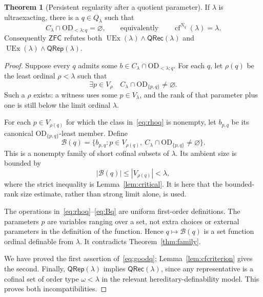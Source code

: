 \documentclass[11pt,letterpaper]{article}
\theoremstyle{definition}
\newtheorem{theorem}[definition]{Theorem}
\numberwithin{equation}{section}
\newcommand{\ZFC}{\mathsf{ZFC}}
\newcommand{\OD}{\mathrm{OD}}
\newcommand{\UEx}{\operatorname{UEx}}
\newcommand{\cf}{\operatorname{cf}}
\newcommand{\Qlam}{Q_\lambda}
\newcommand{\Clam}{C_\lambda}
\newcommand{\ODq}{\OD_{<\lambda;q}}
\newcommand{\QRec}{\mathsf{QRec}}
\newcommand{\QRep}{\mathsf{QRep}}
\begin{document}
\begin{theorem}[Persistent regularity after a quotient parameter]\label{thm:goodq}
If $\lambda$ is ultraexacting, there is a $q\in\Qlam$ such that
\begin{equation}\label{eq:goodq}
\Clam\cap\ODq=\varnothing,
\qquad\text{equivalently}\qquad
\cf^{N_q}(\lambda)=\lambda.
\end{equation}
Consequently $\ZFC$ refutes both $\UEx(\lambda)\wedge\QRec(\lambda)$ and $\UEx(\lambda)\wedge\QRep(\lambda)$.
\end{theorem}

\begin{proof}
Suppose every $q$ admits some $b\in\Clam\cap\ODq$. For each $q$, let $\rho(q)$ be the least ordinal $\rho<\lambda$ such that
\begin{equation}\label{eq:rhoq}
\exists p\in V_\rho\quad
\Clam\cap\OD_{\{p,q\}}\ne\varnothing.
\end{equation}
Such a $\rho$ exists: a witness uses some $p\in V_\lambda$, and the rank of that parameter plus one is still below the limit ordinal $\lambda$.

For each $p\in V_{\rho(q)}$ for which the class in~\eqref{eq:rhoq} is nonempty, let $b_{p,q}$ be its canonical $\OD_{\{p,q\}}$-least member. Define
\begin{equation}\label{eq:Bq}
\mathcal B(q)=
\{b_{p,q}:p\in V_{\rho(q)},\
\Clam\cap\OD_{\{p,q\}}\ne\varnothing\}.
\end{equation}
This is a nonempty family of short cofinal subsets of $\lambda$. Its ambient size is bounded by
\[
|\mathcal B(q)|\le |V_{\rho(q)}|<\lambda,
\]
where the strict inequality is Lemma~\ref{lem:critical}. It is here that the bounded-rank size estimate, rather than strong limit alone, is used.

The operations in~\eqref{eq:rhoq}--\eqref{eq:Bq} are uniform first-order definitions. The parameters $p$ are variables ranging over a set, not extra choices or external parameters in the definition of the function. Hence $q\mapsto\mathcal B(q)$ is a set function ordinal definable from $\lambda$. It contradicts Theorem~\ref{thm:family}.

We have proved the first assertion of~\eqref{eq:goodq}; Lemma~\ref{lem:cfcriterion} gives the second. Finally, $\QRep(\lambda)$ implies $\QRec(\lambda)$, since any representative is a cofinal set of order type $\omega<\lambda$ in the relevant hereditary-definability model. This proves both incompatibilities.
\end{proof}
\end{document}
